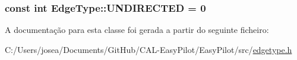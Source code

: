 \subsubsection[{U\+N\+D\+I\+R\+E\+C\+T\+E\+D}]{\setlength{\rightskip}{0pt plus 5cm}const int Edge\+Type\+::\+U\+N\+D\+I\+R\+E\+C\+T\+E\+D = 0\hspace{0.3cm}{\ttfamily [static]}}\label{class_edge_type_a6533cc56d05c288a550b9980b66c9317}


A documentação para esta classe foi gerada a partir do seguinte ficheiro\+:\begin{DoxyCompactItemize}
\item 
C\+:/\+Users/josea/\+Documents/\+Git\+Hub/\+C\+A\+L-\/\+Easy\+Pilot/\+Easy\+Pilot/src/\hyperlink{edgetype_8h}{edgetype.\+h}\end{DoxyCompactItemize}
